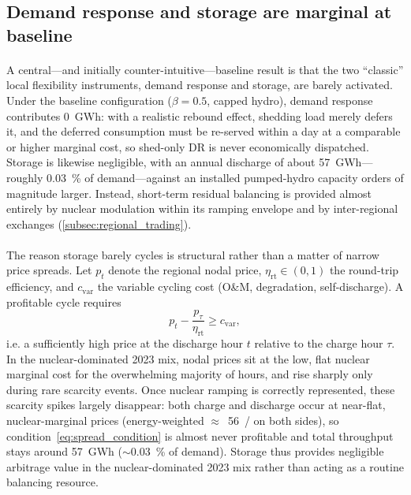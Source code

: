 \documentclass[12pt]{article}
\begin{document}
\subsection{Demand response and storage are marginal at baseline}
\label{subsec:dr_vs_storage}

\paragraph{}
A central---and initially counter-intuitive---baseline result is that the two ``classic'' local flexibility instruments, demand response and storage, are barely activated. Under the baseline configuration ($\beta = 0.5$, capped hydro), demand response contributes \SI{0}{GWh}: with a realistic rebound effect, shedding load merely defers it, and the deferred consumption must be re-served within a day at a comparable or higher marginal cost, so shed-only DR is never economically dispatched. Storage is likewise negligible, with an annual discharge of about \SI{57}{GWh}---roughly \SI{0.03}{\percent} of demand---against an installed pumped-hydro capacity orders of magnitude larger. Instead, short-term residual balancing is provided almost entirely by nuclear modulation within its ramping envelope and by inter-regional exchanges (\cref{subsec:regional_trading}).

\paragraph{}
The reason storage barely cycles is structural rather than a matter of narrow price spreads. Let $p_t$ denote the regional nodal price, $\eta_{\mathrm{rt}}\in(0,1)$ the round-trip efficiency, and $c_{\mathrm{var}}$ the variable cycling cost (O\&M, degradation, self-discharge). A profitable cycle requires
\begin{equation}
  p_t-\frac{p_{\tau}}{\eta_{\mathrm{rt}}}\ge c_{\mathrm{var}},
  \label{eq:spread_condition}
\end{equation}
i.e. a sufficiently high price at the discharge hour $t$ relative to the charge hour $\tau$. In the nuclear-dominated 2023 mix, nodal prices sit at the low, flat nuclear marginal cost for the overwhelming majority of hours, and rise sharply only during rare scarcity events. Once nuclear ramping is correctly represented, these scarcity spikes largely disappear: both charge and discharge occur at near-flat, nuclear-marginal prices (energy-weighted \(\approx\)~\SI{56}{\EUR/\MWh} on both sides), so condition~\eqref{eq:spread_condition} is almost never profitable and total throughput stays around \SI{57}{GWh} (\(\sim\)\SI{0.03}{\percent} of demand). Storage thus provides negligible arbitrage value in the nuclear-dominated 2023 mix rather than acting as a routine balancing resource.
\end{document}
